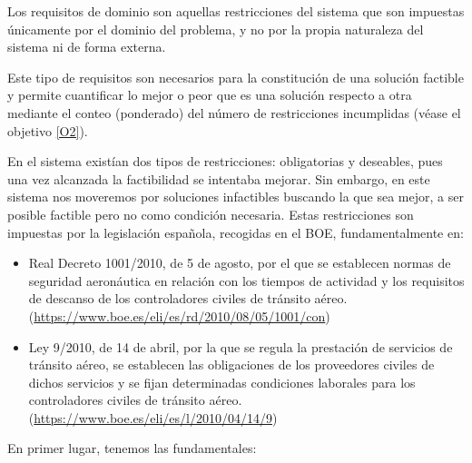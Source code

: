 Los requisitos de dominio son aquellas restricciones del sistema que son impuestas únicamente por el dominio del problema, y no por la propia naturaleza del sistema ni de forma externa.

Este tipo de requisitos son necesarios para la constitución de una solución factible y permite cuantificar lo mejor o peor que es una solución respecto a otra mediante el conteo (ponderado) del número de restricciones incumplidas (véase el objetivo \ref{O2}). 

En el sistema \legacy{} existían dos tipos de restricciones: obligatorias y deseables, pues una vez alcanzada la factibilidad se intentaba mejorar. Sin embargo, en este sistema nos moveremos por soluciones infactibles buscando la que sea mejor, a ser posible factible pero no como condición necesaria. Estas restricciones son impuestas por la legislación española, recogidas en el BOE, fundamentalmente en:

\begin{itemize}
	\item Real Decreto 1001/2010, de 5 de agosto, por el que se establecen normas de seguridad aeronáutica en relación con los tiempos de actividad y los requisitos de descanso de los controladores civiles de tránsito aéreo. \\
	(\url{https://www.boe.es/eli/es/rd/2010/08/05/1001/con})
	
	\item Ley 9/2010, de 14 de abril, por la que se regula la prestación de servicios de tránsito aéreo, se establecen las obligaciones de los proveedores civiles de dichos servicios y se fijan determinadas condiciones laborales para los controladores civiles de tránsito aéreo. \\
	(\url{https://www.boe.es/eli/es/l/2010/04/14/9})
\end{itemize} 



En primer lugar, tenemos las fundamentales:

